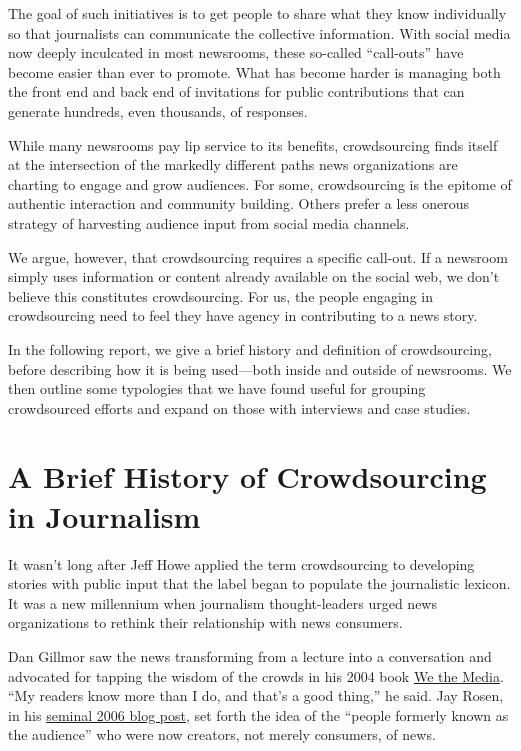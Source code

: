 \begin{itemize}
The goal of such initiatives is to get people to share what they know individually so that journalists can communicate the collective information. With social media now deeply inculcated in most newsrooms, these so-called ``call-outs'' have become easier than ever to promote. What has become harder is managing both the front end and back end of invitations for public contributions that can generate hundreds, even thousands, of responses.

While many newsrooms pay lip service to its benefits, crowdsourcing finds itself at the intersection of the markedly different paths news organizations are charting to engage and grow audiences. For some, crowdsourcing is the epitome of authentic interaction and community building. Others prefer a less onerous strategy of harvesting audience input from social media channels.

We argue, however, that crowdsourcing requires a specific call-out. If a newsroom simply uses information or content already available on the social web, we don’t believe this constitutes crowdsourcing. For us, the people engaging in crowdsourcing need to feel they have agency in contributing to a news story.

In the following report, we give a brief history and definition of crowdsourcing, before describing how it is being used---both inside and outside of newsrooms. We then outline some typologies that we have found useful for grouping crowdsourced efforts and expand on those with interviews and case studies. 


\chapter{A Brief History of Crowdsourcing in Journalism}


It wasn’t long after Jeff Howe applied the term crowdsourcing to developing stories with public input that the label began to populate the journalistic lexicon.\autocite{Howe} It was a new millennium when journalism thought-leaders urged news organizations to rethink their relationship with news consumers. 

Dan Gillmor saw the news transforming from a lecture into a conversation and advocated for tapping the wisdom of the crowds in his 2004 book \underline{We the Media}.\autocite{Gillmor} ``My readers know more than I do, and that’s a good thing,'' he said. Jay Rosen, in his \href{http://archive.pressthink.org/2006/06/27/ppl_frmr.html}{seminal 2006 blog post}, set forth the idea of the ``people formerly known as the audience'' who were now creators, not merely consumers, of news.\autocite{Rosen} 


\end{itemize}
